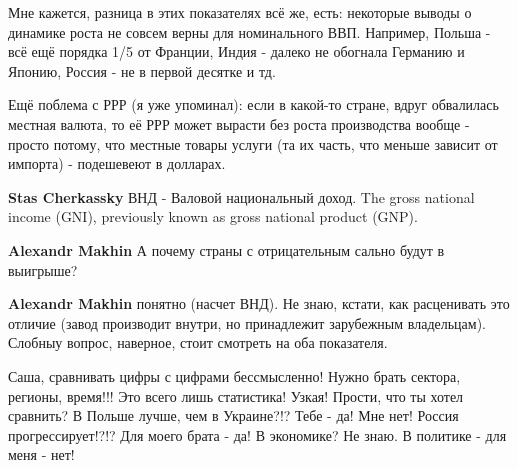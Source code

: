 \begin{itemize}
\begin{itemize}
Мне кажется, разница в этих показателях всё же, есть: некоторые выводы о
динамике роста не совсем верны для номинального ВВП. Например, Польша - всё ещё
порядка 1/5 от Франции, Индия - далеко не обогнала Германию и Японию, Россия -
не в первой десятке и тд.

Ещё поблема с РРР (я уже упоминал): если в какой-то стране, вдруг обвалилась
местная валюта, то её РРР может вырасти без роста производства вообще - просто
потому, что местные товары услуги (та их часть, что меньше зависит от импорта)
- подешевеют в долларах.

 
\textbf{Stas Cherkassky} ВНД - Валовой национальный доход. The gross national income (GNI), previously known as gross national product (GNP).

 
\textbf{Alexandr Makhin} А почему страны с отрицательным сально будут в выигрыше?

 
\textbf{Alexandr Makhin} понятно (насчет ВНД). Не знаю, кстати, как расценивать это отличие (завод производит внутри, но принадлежит зарубежным владельцам). Слобныу вопрос, наверное, стоит смотреть на оба показателя.

\end{itemize}

 

\obeycr
Саша, сравнивать цифры с цифрами бессмысленно!
Нужно брать сектора, регионы, время!!!
Это всего лишь статистика!
Узкая!
Прости, что ты хотел сравнить?
В Польше лучше, чем в Украине?!?
Тебе - да!
Мне нет!
Россия прогрессирует!?!?
Для моего брата - да!
В экономике? Не знаю.
В политике - для меня - нет!
\restorecr


\end{itemize}
